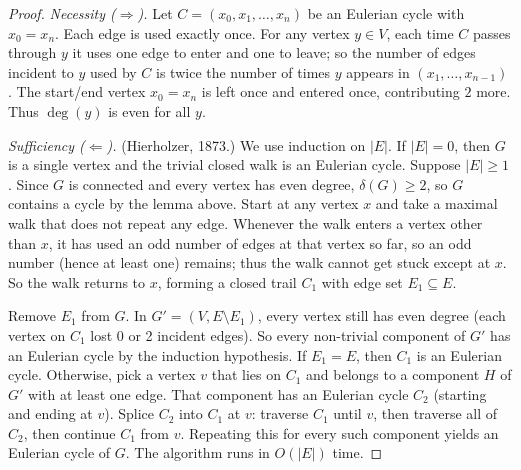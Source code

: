 \documentclass[11pt, a4paper]{ctexrep}
\begin{document}
\begin{proof}
    \emph{Necessity ($\Rightarrow$).} Let $C = (x_0, x_1, \ldots, x_n)$ be an Eulerian cycle with $x_0 = x_n$. Each edge is used exactly once. For any vertex $y \in V$, each time $C$ passes through $y$ it uses one edge to enter and one to leave; so the number of edges incident to $y$ used by $C$ is twice the number of times $y$ appears in $(x_1,\ldots,x_{n-1})$. The start/end vertex $x_0 = x_n$ is left once and entered once, contributing $2$ more. Thus $\deg(y)$ is even for all $y$.

    \emph{Sufficiency ($\Leftarrow$).} (Hierholzer, 1873.) We use induction on $|E|$. If $|E|=0$, then $G$ is a single vertex and the trivial closed walk is an Eulerian cycle. Suppose $|E| \ge 1$. Since $G$ is connected and every vertex has even degree, $\delta(G) \ge 2$, so $G$ contains a cycle by the lemma above. Start at any vertex $x$ and take a maximal walk that does not repeat any edge. Whenever the walk enters a vertex other than $x$, it has used an odd number of edges at that vertex so far, so an odd number (hence at least one) remains; thus the walk cannot get stuck except at $x$. So the walk returns to $x$, forming a closed trail $C_1$ with edge set $E_1 \subseteq E$.

    Remove $E_1$ from $G$. In $G' = (V, E \setminus E_1)$, every vertex still has even degree (each vertex on $C_1$ lost 0 or 2 incident edges). So every non-trivial component of $G'$ has an Eulerian cycle by the induction hypothesis. If $E_1 = E$, then $C_1$ is an Eulerian cycle. Otherwise, pick a vertex $v$ that lies on $C_1$ and belongs to a component $H$ of $G'$ with at least one edge. That component has an Eulerian cycle $C_2$ (starting and ending at $v$). Splice $C_2$ into $C_1$ at $v$: traverse $C_1$ until $v$, then traverse all of $C_2$, then continue $C_1$ from $v$. Repeating this for every such component yields an Eulerian cycle of $G$. The algorithm runs in $O(|E|)$ time.
\end{proof}
\end{document}
